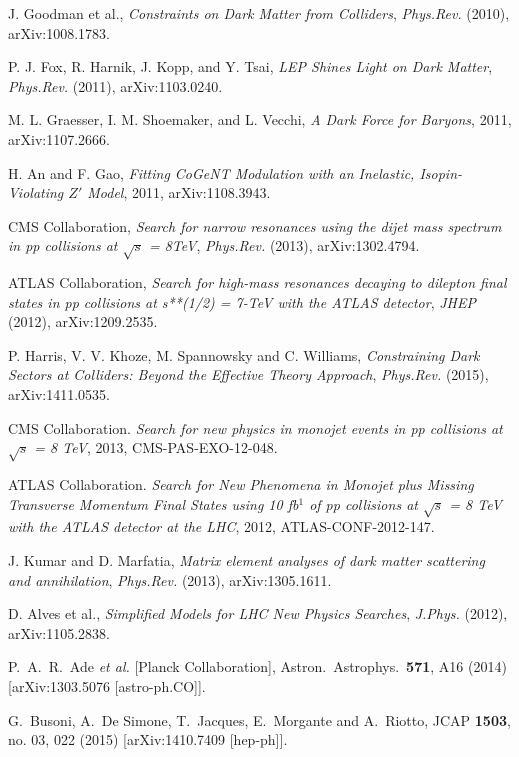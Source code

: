 J. Goodman et al., \emph{Constraints on Dark Matter from Colliders}, \emph{Phys.Rev.} (2010), arXiv:1008.1783.

P. J. Fox, R. Harnik, J. Kopp, and Y. Tsai, \emph{LEP Shines Light on Dark Matter}, \emph{Phys.Rev.} (2011), arXiv:1103.0240.

M. L. Graesser, I. M. Shoemaker, and L. Vecchi, \emph{A Dark Force for Baryons}, 2011, arXiv:1107.2666.

H. An and F. Gao, \emph{Fitting CoGeNT Modulation with an Inelastic, Isopin-Violating $Z'$ Model}, 2011, arXiv:1108.3943.

CMS Collaboration, \emph{
Search for narrow resonances using the dijet mass spectrum in pp collisions at $\sqrt{s}$ = 8TeV}, \emph{Phys.Rev.} (2013), arXiv:1302.4794.

ATLAS Collaboration, \emph{Search for high-mass resonances decaying to dilepton final states in pp collisions at s**(1/2) = 7-TeV with the ATLAS detector}, \emph{JHEP} (2012), arXiv:1209.2535.

P. Harris, V. V. Khoze, M. Spannowsky and C. Williams, \emph{Constraining Dark Sectors at Colliders: Beyond the Effective Theory Approach}, \emph{Phys.Rev.} (2015), arXiv:1411.0535.

CMS Collaboration. \emph{Search for new physics in monojet events in pp collisions at $\sqrt{s}$ = 8 TeV}, 2013, CMS-PAS-EXO-12-048.

ATLAS Collaboration. \emph{Search for New Phenomena in Monojet plus Missing Transverse Momentum Final States using 10 fb$^{1}$ of pp collisions at $\sqrt{s}$ = 8 TeV with the ATLAS detector at the LHC}, 2012, ATLAS-CONF-2012-147.

J. Kumar and D. Marfatia, \emph{Matrix element analyses of dark matter scattering and annihilation}, \emph{Phys.Rev.} (2013), arXiv:1305.1611.

D. Alves et al., \emph{Simplified Models for LHC New Physics Searches}, \emph{J.Phys.} (2012), arXiv:1105.2838.

  P.~A.~R.~Ade {\it et al.}  [Planck Collaboration],
  Astron.\ Astrophys.\  {\bf 571}, A16 (2014)
  [arXiv:1303.5076 [astro-ph.CO]].

  G.~Busoni, A.~De Simone, T.~Jacques, E.~Morgante and A.~Riotto,
  JCAP {\bf 1503}, no. 03, 022 (2015)
  [arXiv:1410.7409 [hep-ph]].

